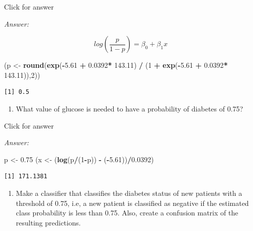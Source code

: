 \documentclass[
]{book}
\newenvironment{Shaded}{\begin{snugshade}}{\end{snugshade}}
\newcommand{\DecValTok}[1]{\textcolor[rgb]{0.00,0.00,0.81}{#1}}
\newcommand{\FloatTok}[1]{\textcolor[rgb]{0.00,0.00,0.81}{#1}}
\newcommand{\FunctionTok}[1]{\textcolor[rgb]{0.13,0.29,0.53}{\textbf{#1}}}
\newcommand{\NormalTok}[1]{#1}
\newcommand{\OtherTok}[1]{\textcolor[rgb]{0.56,0.35,0.01}{#1}}
\newcommand{\SpecialCharTok}[1]{\textcolor[rgb]{0.81,0.36,0.00}{\textbf{#1}}}
\providecommand{\tightlist}{%
  \setlength{\itemsep}{0pt}\setlength{\parskip}{0pt}}
\begin{document}
Click for answer

\emph{Answer:}

\[log\left(\frac{p}{1-p}\right)  = \beta_0 + \beta_1x\]

\begin{Shaded}
\begin{Highlighting}[]
\NormalTok{(p }\OtherTok{\textless{}{-}} \FunctionTok{round}\NormalTok{(}\FunctionTok{exp}\NormalTok{(}\SpecialCharTok{{-}}\FloatTok{5.61} \SpecialCharTok{+} \FloatTok{0.0392}\SpecialCharTok{*} \FloatTok{143.11}\NormalTok{) }\SpecialCharTok{/}\NormalTok{ (}\DecValTok{1} \SpecialCharTok{+} \FunctionTok{exp}\NormalTok{(}\SpecialCharTok{{-}}\FloatTok{5.61} \SpecialCharTok{+} \FloatTok{0.0392}\SpecialCharTok{*} \FloatTok{143.11}\NormalTok{)),}\DecValTok{2}\NormalTok{))}
\end{Highlighting}
\end{Shaded}

\begin{verbatim}
[1] 0.5
\end{verbatim}

\begin{enumerate}
\def\labelenumi{\alph{enumi}.}
\setcounter{enumi}{2}
\tightlist
\item
  What value of glucose is needed to have a probability of diabetes of 0.75?
\end{enumerate}

Click for answer

\emph{Answer:}

\begin{Shaded}
\begin{Highlighting}[]
\NormalTok{p }\OtherTok{\textless{}{-}} \FloatTok{0.75}
\NormalTok{(x }\OtherTok{\textless{}{-}}\NormalTok{ (}\FunctionTok{log}\NormalTok{(p}\SpecialCharTok{/}\NormalTok{(}\DecValTok{1}\SpecialCharTok{{-}}\NormalTok{p)) }\SpecialCharTok{{-}}\NormalTok{ (}\SpecialCharTok{{-}}\FloatTok{5.61}\NormalTok{))}\SpecialCharTok{/}\FloatTok{0.0392}\NormalTok{)  }
\end{Highlighting}
\end{Shaded}

\begin{verbatim}
[1] 171.1381
\end{verbatim}

\begin{enumerate}
\def\labelenumi{\alph{enumi}.}
\setcounter{enumi}{3}
\tightlist
\item
  Make a classifier that classifies the diabetes status of new patients with a threshold of 0.75, i.e, a new patient is classified as negative if the estimated class probability is less than 0.75. Also, create a confusion matrix of the resulting predictions.
\end{enumerate}
\end{document}
